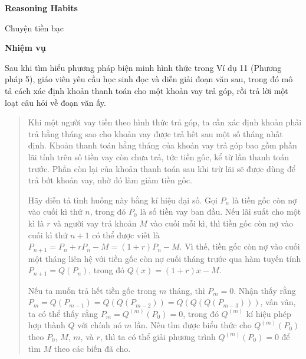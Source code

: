 {\begin{hanglist}
    \end{hanglist}

    \textbf{Reasoning Habits}

    \begin{hanglist}

      
    \end{hanglist}
  }
  {
    Chuyện tiền bạc
  }
  {
    \textbf{Nhiệm vụ}

    Sau khi tìm hiểu phương pháp biện minh hình thức trong Ví dụ 11 (Phương pháp 5), giáo viên yêu cầu học sinh đọc và diễn giải đoạn văn sau, trong đó mô tả cách xác định khoản thanh toán cho một khoản vay trả góp, rồi trả lời một loạt câu hỏi về đoạn văn ấy.

    \begin{quote}  
      Khi một người vay tiền theo hình thức trả góp, ta cần xác định khoản phải trả hằng tháng sao cho khoản vay được trả hết sau một số tháng nhất định. Khoản thanh toán hằng tháng của khoản vay trả góp bao gồm phần lãi tính trên số tiền vay còn chưa trả, tức tiền gốc, kể từ lần thanh toán trước. Phần còn lại của khoản thanh toán sau khi trừ lãi sẽ được dùng để trả bớt khoản vay, nhờ đó làm giảm tiền gốc.\vspace{\baselineskip}

      Hãy diễn tả tình huống này bằng kí hiệu đại số. Gọi $P_n$ là tiền gốc còn nợ vào cuối kì thứ $n$, trong đó $P_0$ là số tiền vay ban đầu. Nếu lãi suất cho một kì là $r$ và người vay trả khoản $M$ vào cuối mỗi kì, thì tiền gốc còn nợ vào cuối kì thứ $n+1$ có thể được viết là $P_{n+1}=P_n+rP_n-M=(1+r)P_n-M$. Vì thế, tiền gốc còn nợ vào cuối một tháng liên hệ với tiền gốc còn nợ cuối tháng trước qua hàm tuyến tính $P_{n+1}=Q(P_n)$, trong đó $Q(x)=(1+r)x-M$.\vspace{3\baselineskip}

      Nếu ta muốn trả hết tiền gốc trong $m$ tháng, thì $P_m=0$. Nhận thấy rằng $P_m=Q(P_{m-1})=Q(Q(P_{m-2}))=Q(Q(Q(P_{m-3})))$, vân vân, ta có thể thấy rằng $P_m=Q^{(m)}(P_0)=0$, trong đó $Q^{(m)}$ kí hiệu phép hợp thành $Q$ với chính nó $m$ lần. Nếu tìm được biểu thức cho $Q^{(m)}(P_0)$ theo $P_0$, $M$, $m$, và $r$, thì ta có thể giải phương trình $Q^{(m)}(P_0)=0$ để tìm $M$ theo các biến đã cho.


\end{quote}}

